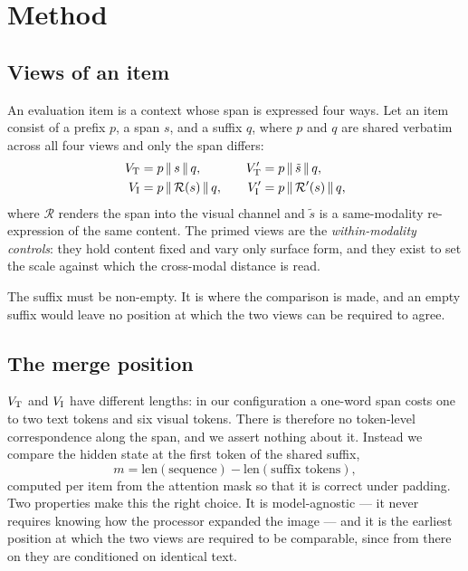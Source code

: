 \section{Method}
\label{sec:method}



\subsection{Views of an item}

An evaluation item is a context whose span is expressed four ways. Let an item
consist of a prefix $p$, a span $s$, and a suffix $q$, where $p$ and $q$ are
shared verbatim across all four views and only the span differs:
\begin{align}
    V_{\mathrm{T}}   &= p \,\Vert\, s \,\Vert\, q,          &\quad
    V_{\mathrm{T}}'  &= p \,\Vert\, \tilde{s} \,\Vert\, q, \\
    V_{\mathrm{I}}   &= p \,\Vert\, \mathcal{R}(s) \,\Vert\, q, &\quad
    V_{\mathrm{I}}'  &= p \,\Vert\, \mathcal{R}'(s) \,\Vert\, q,
\end{align}
where $\mathcal{R}$ renders the span into the visual channel and $\tilde{s}$ is
a same-modality re-expression of the same content. The primed views are the
\emph{within-modality controls}: they hold content fixed and vary only surface
form, and they exist to set the scale against which the cross-modal distance is
read.

The suffix must be non-empty. It is where the comparison is made, and an empty
suffix would leave no position at which the two views can be required to agree.

\subsection{The merge position}
\label{sec:merge}

$V_{\mathrm{T}}$ and $V_{\mathrm{I}}$ have different lengths: in our configuration a one-word span
costs one to two text tokens and six visual tokens. There is therefore no
token-level correspondence along the span, and we assert nothing about it.
Instead we compare the hidden state at the first token of the shared suffix,
\begin{equation}
    m = \text{len}(\text{sequence}) - \text{len}(\text{suffix tokens}),
    \label{eq:merge}
\end{equation}
computed per item from the attention mask so that it is correct under padding.
Two properties make this the right choice. It is model-agnostic --- it never
requires knowing how the processor expanded the image --- and it is the earliest
position at which the two views are required to be comparable, since from there
on they are conditioned on identical text.


